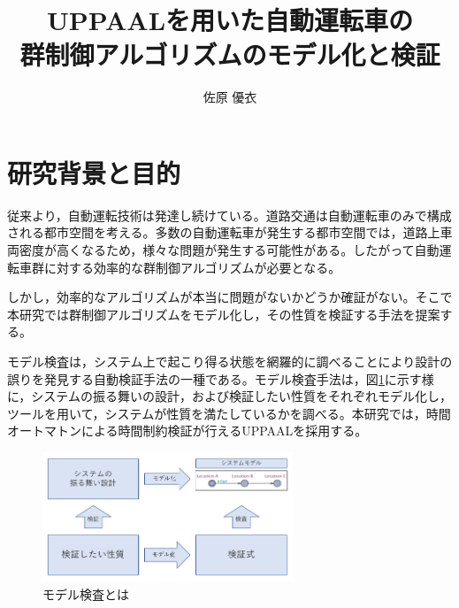 \documentclass[10pt]{tpu-abst-utf}
\author{佐原 優衣}
\title{UPPAALを用いた自動運転車の\\群制御アルゴリズムのモデル化と検証}
\begin{document}
%
\maketitle
%
%
\section{研究背景と目的}
従来より，自動運転技術は発達し続けている。道路交通は自動運転車のみで構成される都市空間を考える。多数の自動運転車が発生する都市空間では，道路上車両密度が高くなるため，様々な問題が発生する可能性がある。したがって自動運転車群に対する効率的な群制御アルゴリズムが必要となる。
	
しかし，効率的なアルゴリズムが本当に問題がないかどうか確証がない。そこで本研究では群制御アルゴリズムをモデル化し，その性質を検証する手法を提案する。

モデル検査は，システム上で起こり得る状態を網羅的に調べることにより設計の誤りを発見する自動検証手法の一種である。モデル検査手法は，図\ref{ModelV}に示す様に，システムの振る舞いの設計，および検証したい性質をそれぞれモデル化し，ツールを用いて，システムが性質を満たしているかを調べる。本研究では，時間オートマトンによる時間制約検証が行えるUPPAALを採用する。
	\begin{figure}[htbp]
	\centering
	\includegraphics[width=75mm]{ModelVerification.png}
	\caption{モデル検査とは}
	\label{ModelV}
	\end{figure}
\end{document}
